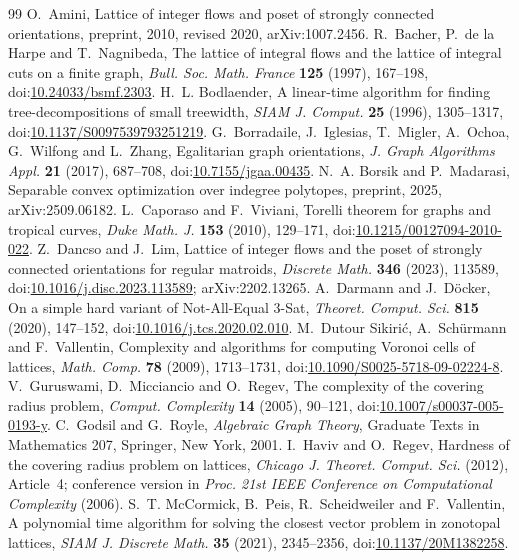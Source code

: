 \documentclass[11pt]{amsart}
\theoremstyle{definition}
\theoremstyle{remark}
\numberwithin{equation}{section}
\newcommand{\doi}[1]{doi:\href{https://doi.org/#1}{#1}}
\begin{document}
\begin{thebibliography}{99}
 O.~Amini, Lattice of integer flows and poset of strongly connected orientations, preprint, 2010, revised 2020, arXiv:1007.2456.
 R.~Bacher, P.~de la Harpe and T.~Nagnibeda, The lattice of integral flows and the lattice of integral cuts on a finite graph, \emph{Bull. Soc. Math. France} \textbf{125} (1997), 167--198, \doi{10.24033/bsmf.2303}.
 H.~L. Bodlaender, A linear-time algorithm for finding tree-decompositions of small treewidth, \emph{SIAM J. Comput.} \textbf{25} (1996), 1305--1317, \doi{10.1137/S0097539793251219}.
 G.~Borradaile, J.~Iglesias, T.~Migler, A.~Ochoa, G.~Wilfong and L.~Zhang, Egalitarian graph orientations, \emph{J. Graph Algorithms Appl.} \textbf{21} (2017), 687--708, \doi{10.7155/jgaa.00435}.
 N.~A. Borsik and P.~Madarasi, Separable convex optimization over indegree polytopes, preprint, 2025, arXiv:2509.06182.
 L.~Caporaso and F.~Viviani, Torelli theorem for graphs and tropical curves, \emph{Duke Math. J.} \textbf{153} (2010), 129--171, \doi{10.1215/00127094-2010-022}.
 Z.~Dancso and J.~Lim, Lattice of integer flows and the poset of strongly connected orientations for regular matroids, \emph{Discrete Math.} \textbf{346} (2023), 113589, \doi{10.1016/j.disc.2023.113589}; arXiv:2202.13265.
 A.~Darmann and J.~D\"ocker, On a simple hard variant of Not-All-Equal 3-Sat, \emph{Theoret. Comput. Sci.} \textbf{815} (2020), 147--152, \doi{10.1016/j.tcs.2020.02.010}.
 M.~Dutour Sikiri\'c, A.~Sch\"urmann and F.~Vallentin, Complexity and algorithms for computing Voronoi cells of lattices, \emph{Math. Comp.} \textbf{78} (2009), 1713--1731, \doi{10.1090/S0025-5718-09-02224-8}.
 V.~Guruswami, D.~Micciancio and O.~Regev, The complexity of the covering radius problem, \emph{Comput. Complexity} \textbf{14} (2005), 90--121, \doi{10.1007/s00037-005-0193-y}.
 C.~Godsil and G.~Royle, \emph{Algebraic Graph Theory}, Graduate Texts in Mathematics 207, Springer, New York, 2001.
 I.~Haviv and O.~Regev, Hardness of the covering radius problem on lattices, \emph{Chicago J. Theoret. Comput. Sci.} (2012), Article~4; conference version in \emph{Proc. 21st IEEE Conference on Computational Complexity} (2006).
 S.~T. McCormick, B.~Peis, R.~Scheidweiler and F.~Vallentin, A polynomial time algorithm for solving the closest vector problem in zonotopal lattices, \emph{SIAM J. Discrete Math.} \textbf{35} (2021), 2345--2356, \doi{10.1137/20M1382258}.

\end{thebibliography}
\end{document}
